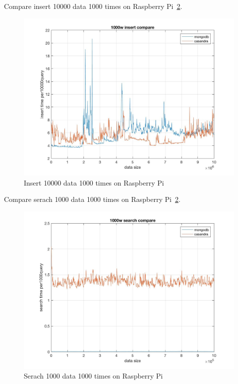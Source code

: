 Compare insert 10000 data 1000 times on Raspberry Pi~\ref{f:fly}.

\begin{figure}[!ht]
  \centering\includegraphics[width=\columnwidth]
  {images/insert_comp_10000_pi.jpg}
  \caption{Insert 10000 data 1000 times on Raspberry Pi}\label{f:fly}
\end{figure}

Compare serach 1000 data 1000 times on Raspberry Pi~\ref{f:fly}.

\begin{figure}[!ht]
  \centering\includegraphics[width=\columnwidth]
  {images/search_comp_1000_pi.jpg}
  \caption{Serach 1000 data 1000 times on Raspberry Pi }\label{f:fly}
\end{figure}

